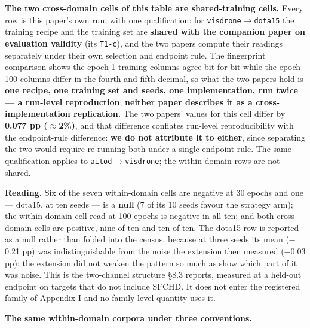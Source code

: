 \documentclass[pdflatex,sn-mathphys-ay]{sn-jnl}
\begin{document}
\textbf{The two cross-domain cells of this table are shared-training cells.} Every row is this paper's own run, with one qualification: for \texttt{visdrone\ensuremath{\rightarrow}dota15} the training recipe and the training set are \textbf{shared with the companion paper on evaluation validity} (its \texttt{T1-c}), and the two papers compute their readings separately under their own selection and endpoint rule. The fingerprint comparison shows the epoch-1 training columns agree bit-for-bit while the epoch-100 columns differ in the fourth and fifth decimal, so what the two papers hold is \textbf{one recipe, one training set and seeds, one implementation, run twice --- a run-level reproduction}; \textbf{neither paper describes it as a cross-implementation replication.} The two papers' values for this cell differ by \textbf{0.077 pp (\ensuremath{\approx}2\%)}, and that difference conflates run-level reproducibility with the endpoint-rule difference: \textbf{we do not attribute it to either}, since separating the two would require re-running both under a single endpoint rule. The same qualification applies to \texttt{aitod\ensuremath{\rightarrow}visdrone}; the within-domain rows are not shared.

\textbf{Reading.} Six of the seven within-domain cells are negative at 30 epochs and one --- dota15, at ten seeds --- is a \textbf{null} (7 of its 10 seeds favour the strategy arm); the within-domain cell read at 100 epochs is negative in all ten; and both cross-domain cells are positive, nine of ten and ten of ten. The dota15 row is reported as a null rather than folded into the census, because at three seeds its mean (\ensuremath{-}0.21 pp) was indistinguishable from the noise the extension then measured (\ensuremath{-}0.03 pp): the extension did not weaken the pattern so much as show which part of it was noise. This is the two-channel structure \S{}8.3 reports, measured at a held-out endpoint on targets that do not include SFCHD. It does not enter the registered family of Appendix I and no family-level quantity uses it.

\textbf{The same within-domain corpora under three conventions.}
\end{document}
